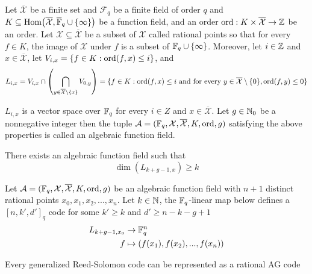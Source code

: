 \documentclass{article}
\begin{document}
\begin{definition}
    Let $\overline{\mathcal{X}}$ be a finite set and $\mathcal{F}_q$ be a finite field of order $q$ and $K \subseteq \Hom\tuple*{ \overline{\mathcal{X}}, \overline{\F}_q \cup \set{\infty} }$ be a function field, and an order $\ord: K \times \overline{\mathcal{X}} \to \Z$ be an order. Let $\mathcal{X} \subseteq \overline{\mathcal{X}}$ be a subset of $\mathcal{X}$ called rational points so that for every $f \in K$, the image of $\mathcal{X}$ under $f$ is a subset of $\F_q \cup \set{\infty}$. Moreover, let $i \in \Z$ and $x \in \overline{\mathcal{X}}$, let $V_{i, x} = \set{f \in K: \ord(f, x) \leq i}$, and
    $$
        L_{i, x} = V_{i, x} \cap \tuple*{\bigcap_{y \in \overline{\mathcal{X}} \setminus \set{x}} V_{0, y}} = \set{f \in K: \ord(f, x) \leq i \text{ and for every } y \in \overline{\mathcal{X}} \setminus \set{0}, \ord(f, y) \leq 0 }
    $$

    $L_{i, x}$ is a vector space over $\F_q$ for every $i \in Z$ and $x \in \overline{\mathcal{X}}$. Let $g \in \N_0$ be a nonnegative integer then the tuple $\mathcal{A} = (\F_q, \mathcal{X}, \overline{\mathcal{X}}, K, \ord, g)$ satisfying the above properties is called an algebraic function field.
\end{definition}

\begin{theorem}
    There exists an algebraic function field such that
    $$
        \dim(L_{k+g-1, x}) \geq k
    $$
\end{theorem}

\begin{proposition}
    Let $\mathcal{A} = (\F_q, \mathcal{X}, \overline{\mathcal{X}}, K, \ord, g)$ be an algebraic function field with $n+1$ distinct rational points $x_0, x_1, x_2, ..., x_n$. Let $k \in \N$, the $\F_q$-linear map below defines a $[n, k', d']_q$ code for some $k' \geq k$ and $d' \geq n - k - g + 1$
    \begin{align*}
        L_{k+g-1, x_0} &\to \F_q^n \\
        f &\mapsto (f(x_1), f(x_2), ..., f(x_n))
    \end{align*}
\end{proposition}

\begin{proposition}
    Every generalized Reed-Solomon code can be represented as a rational AG code
\end{proposition}
\end{document}
